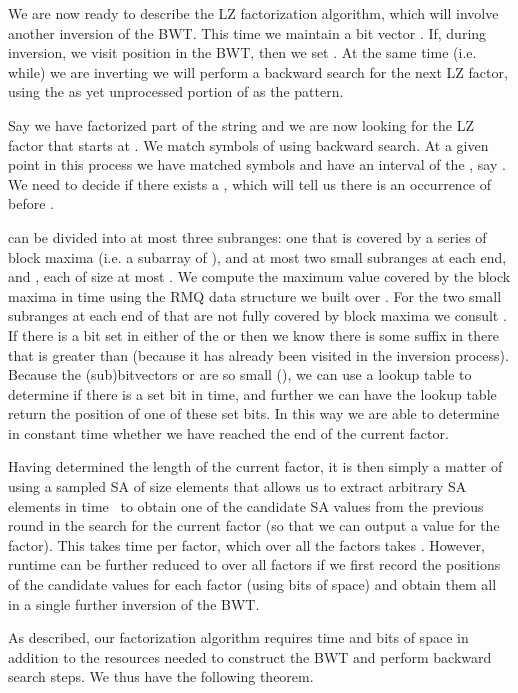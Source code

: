 \documentclass[11pt,runningheads]{llncs}
\begin{document}
{We are now ready to describe the LZ factorization algorithm, which will involve another 
inversion of the BWT. This time we maintain a bit vector . If, during
inversion, we visit position  in the BWT, then we set . At the same
time (i.e. while) we are inverting we will perform a backward search for the next LZ factor,
using the as yet unprocessed portion of  as the pattern.

Say we have factorized part of the string and we are now looking for the LZ
factor that starts at . We match symbols of  using backward search. At a given point
in this process we have matched  symbols and have an interval of the , say .
We need to decide if there exists a , which will tell us there is an
occurrence of  before .

 can be divided into at most three subranges: one that is covered by a series of block
maxima (i.e. a subarray of ), and at most two small subranges at each end, 
and , each of size at most . We compute the maximum value
covered by the block maxima in  time using the RMQ data structure we built over .
For the two small subranges at each end of  that are not fully covered by block
maxima we consult . If there is a bit set in either of the  or  then
we know there is some suffix in there that is greater than  (because it has already been
visited in the inversion process). Because the (sub)bitvectors 
 or  are so small (), we can use
a lookup table to determine if there is a set bit in  time, and further we can have
the lookup table return the position of one of these set bits. In this way we are able to 
determine in constant time whether we have reached the end of the current factor.

Having determined the length of the current factor, it is then simply a matter 
of using a sampled SA of size  elements that allows us to extract 
arbitrary SA elements in  time~\cite{fm2005} to obtain one of the candidate SA 
values from the previous round 
in the search for the current factor (so that we can output a  value for the factor). 
This takes  time per factor, which over all the 
factors takes . However, runtime can be further reduced to  over all 
factors if we first record the positions of the candidate  values for each factor 
(using  bits of space) and obtain them all in a single further inversion 
of the BWT.

As described, our factorization algorithm requires  time and  bits 
of space in addition to the resources needed to construct the BWT and perform  
backward search steps. We thus have the following theorem.

}
\end{document}
